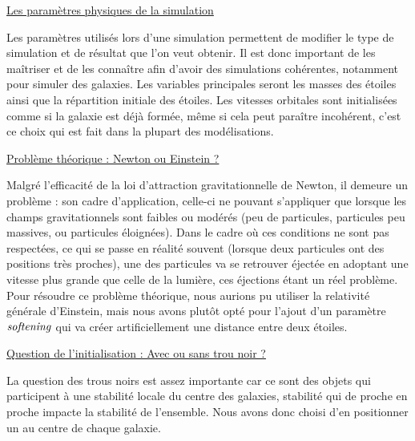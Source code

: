 \vspace{3mm}
\underline{Les paramètres physiques de la simulation}
\vspace{2mm}

Les paramètres utilisés lors d'une simulation permettent de modifier le type de simulation et de résultat que l'on veut obtenir. Il est donc important de les maîtriser et de les connaître afin d'avoir des simulations cohérentes, notamment pour simuler des galaxies. Les variables principales seront les masses des étoiles ainsi que la répartition initiale des étoiles. Les vitesses orbitales sont initialisées comme si la galaxie est déjà formée, même si cela peut paraître incohérent, c'est ce choix qui est fait dans la plupart des modélisations.

\vspace{3mm}
\underline{Problème théorique : Newton ou Einstein ?}
\vspace{2mm}

Malgré l'efficacité de la loi d'attraction gravitationnelle de Newton, il demeure un problème : son cadre d'application, celle-ci ne pouvant s'appliquer que lorsque les champs gravitationnels sont faibles ou modérés (peu de particules, particules peu massives, ou particules éloignées). Dans le cadre où ces conditions ne sont pas respectées, ce qui se passe en réalité souvent (lorsque deux particules ont des positions très proches), une des particules va se retrouver éjectée en adoptant une vitesse plus grande que celle de la lumière, ces éjections étant un réel problème. Pour résoudre ce problème théorique, nous aurions pu utiliser la relativité générale d'Einstein, mais nous avons plutôt opté pour l'ajout d'un paramètre $\it{softening}$ qui va créer artificiellement une distance entre deux étoiles.

\vspace{3mm}
\underline{Question de l'initialisation : Avec ou sans trou noir ?}
\vspace{2mm}

La question des trous noirs est assez importante car ce sont des objets qui participent à une stabilité locale du centre des galaxies, stabilité qui de proche en proche impacte la stabilité de l'ensemble. Nous avons donc choisi d'en positionner un au centre de chaque galaxie.